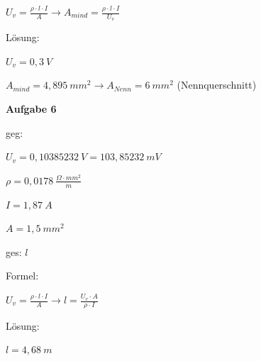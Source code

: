 $U_v = \frac{\rho \cdot l \cdot I}{A} \to A_{mind} = \frac{\rho \cdot l \cdot I}{U_v}$

Lösung:

$U_v = 0,3~V$

$A_{mind} = 4,895~mm^2 \to A_{Nenn} = 6~mm^2$ (Nennquerschnitt)

\textbf{Aufgabe 6}

geg:

$U_v = 0,10385232~V = 103,85232~mV$

$\rho = 0,0178~\frac{\Omega \cdot mm^2}{m}$

$I = 1,87~A$

$A = 1,5~mm^2$

ges: $l$

Formel:

$U_v = \frac{\rho \cdot l \cdot I}{A} \to l = \frac{U_v \cdot A}{\rho \cdot I}$

Lösung:

$l = 4,68~m$
